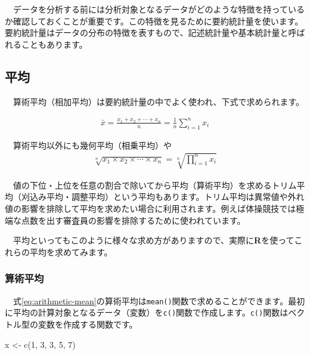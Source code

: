 \documentclass[
  12pt,
]{book}
\newenvironment{Shaded}{\begin{snugshade}}{\end{snugshade}}
\newcommand{\DecValTok}[1]{\textcolor[rgb]{0.00,0.00,0.81}{#1}}
\newcommand{\FunctionTok}[1]{\textcolor[rgb]{0.00,0.00,0.00}{#1}}
\newcommand{\NormalTok}[1]{#1}
\newcommand{\OtherTok}[1]{\textcolor[rgb]{0.56,0.35,0.01}{#1}}
\begin{document}
　データを分析する前には分析対象となるデータがどのような特徴を持っているか確認しておくことが重要です。この特徴を見るために要約統計量を使います。要約統計量はデータの分布の特徴を表すもので、記述統計量や基本統計量と呼ばれることもあります。

\hypertarget{ux5e73ux5747}{%
\subsection{\texorpdfstring{平均}{平均}}\label{ux5e73ux5747}}

　算術平均（相加平均）は要約統計量の中でよく使われ、下式で求められます。

\begin{align}
  \bar{x} = \frac{x_1 + x_2 + \cdots + x_n}{n} = \frac{1}{n} \sum_{i = 1}^n x_i \label{eq:arithmetic-mean}
\end{align}

　算術平均以外にも幾何平均（相乗平均）や \begin{align}
  \sqrt[n]{x_1 \times x_2 \times \cdots \times x_n} = \sqrt[n]{\prod_{i = 1}^n x_i} \label{eq:geometric-mean}
\end{align}

　値の下位・上位を任意の割合で除いてから平均（算術平均）を求めるトリム平均（刈込み平均・調整平均）という平均もあります。トリム平均は異常値や外れ値の影響を排除して平均を求めたい場合に利用されます。例えば体操競技では極端な点数を出す審査員の影響を排除するために使われています。

　平均といってもこのように様々な求め方がありますので、実際に\textbf{R}を使ってこれらの平均を求めてみます。

\hypertarget{ux7b97ux8853ux5e73ux5747}{%
\subsubsection*{\texorpdfstring{算術平均}{算術平均}}\label{ux7b97ux8853ux5e73ux5747}}

　式\eqref{eq:arithmetic-mean}の算術平均は\texttt{mean()}関数で求めることができます。最初に平均の計算対象となるデータ（変数）を\texttt{c()}関数で作成します。\texttt{c()}関数はベクトル型の変数を作成する関数です。

\begin{Shaded}
\begin{Highlighting}[numbers=left,,]
\NormalTok{x }\OtherTok{\textless{}{-}} \FunctionTok{c}\NormalTok{(}\DecValTok{1}\NormalTok{, }\DecValTok{3}\NormalTok{, }\DecValTok{3}\NormalTok{, }\DecValTok{5}\NormalTok{, }\DecValTok{7}\NormalTok{)}
\end{Highlighting}
\end{Shaded}
\end{document}
